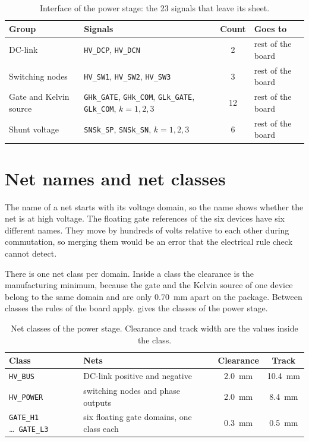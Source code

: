 \begin{table}[H]
\centering
\caption{Interface of the power stage: the 23 signals that leave its
sheet.}
\label{tab:interface}
\small
\zebra
\begin{tabularx}{\textwidth}{lYcl}
\toprule
Group & Signals & Count & Goes to \\
\midrule
DC-link & \texttt{HV\_DCP}, \texttt{HV\_DCN} & 2 & rest of the board \\
Switching nodes & \texttt{HV\_SW1}, \texttt{HV\_SW2}, \texttt{HV\_SW3} & 3 & rest of the board \\
Gate and Kelvin source & \texttt{GHk\_GATE}, \texttt{GHk\_COM}, \texttt{GLk\_GATE}, \texttt{GLk\_COM}, $k = 1,2,3$ & 12 & rest of the board \\
Shunt voltage & \texttt{SNSk\_SP}, \texttt{SNSk\_SN}, $k = 1,2,3$ & 6 & rest of the board \\
\bottomrule
\end{tabularx}
\end{table}

\section{Net names and net classes}

The name of a net starts with its voltage domain, so the name shows whether
the net is at high voltage. The floating gate references of the six devices
have six different names. They move by hundreds of volts relative to each
other during commutation, so merging them would be an error that the
electrical rule check cannot detect.

There is one net class per domain. Inside a class the clearance is the
manufacturing minimum, because the gate and the Kelvin source of one device
belong to the same domain and are only \SI{0.70}{\milli\metre} apart on the
package. Between classes the rules of the board apply. 
gives the classes of the power stage.

\begin{table}[H]
\centering
\caption{Net classes of the power stage. Clearance and track width are the
values inside the class.}
\label{tab:netclasses}
\small
\zebra
\begin{tabularx}{\textwidth}{lYcc}
\toprule
Class & Nets & Clearance & Track \\
\midrule
\texttt{HV\_BUS}   & DC-link positive and negative & \SI{2.0}{\milli\metre} & \SI{10.4}{\milli\metre} \\
\texttt{HV\_POWER} & switching nodes and phase outputs & \SI{2.0}{\milli\metre} & \SI{8.4}{\milli\metre} \\
\texttt{GATE\_H1} \ldots\ \texttt{GATE\_L3} & six floating gate domains, one class each & \SI{0.3}{\milli\metre} & \SI{0.5}{\milli\metre} \\
\bottomrule
\end{tabularx}
\end{table}

